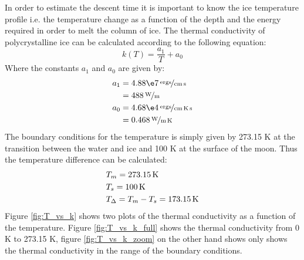 \label{sec:IceTemperatureProfile}

%

In order to estimate the descent time it is important to know the ice temperature profile i.e. the temperature change as a function of the depth and the energy required in order to melt the column of ice. The thermal conductivity of polycrystalline ice can be calculated according to the following equation\cite[(2.3)]{article:thermalConductivity}:
\begin{equation}
	k(T) = \frac{a_1}{T} + a_0
\end{equation}
Where the constants $a_1$ and $a_0$ are given by:
\begin{align}
	a_1 &= \unitfrac[4.88 \e7]{ergs}{cm \, s} \\ \nonumber
		&= \unitfrac[488]{W}{m} \\
	a_0 &= \unitfrac[4.68 \e4]{ergs}{cm \, K \, s} \\ \nonumber
		&= \unitfrac[0.468]{W}{m \, K}
\end{align}
The boundary conditions for the temperature is simply given by 273.15 K at the transition between the water and ice and 100 K at the surface of the moon\cite{article:thermalConductivity}. Thus the temperature difference can be calculated:
\begin{align}
	& T_m = \unit[273.15]{K} \\
	& T_s = \unit[100]{K} \\
	& T_\Delta = T_m - T_s = \unit[173.15]{K}
\end{align}
Figure \ref{fig:T_vs_k} shows two plots of the thermal conductivity as a function of the temperature. Figure \ref{fig:T_vs_k_full} shows the thermal conductivity from 0 K to 273.15 K, figure \ref{fig:T_vs_k_zoom} on the other hand shows only shows the thermal conductivity in the range of the boundary conditions.
